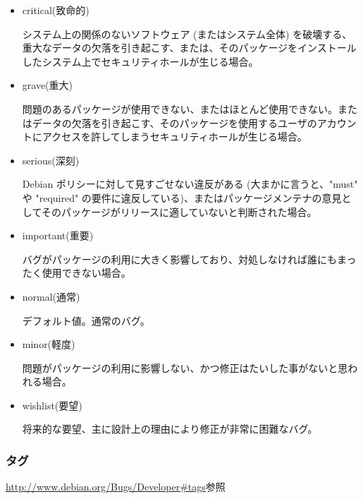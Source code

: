 \documentclass[mingoth,a4paper]{jsarticle}
\begin{document}
\begin{itemize}
\item critical(致命的)

システム上の関係のないソフトウェア (またはシステム全体) を破壊する、重大なデータの欠落を引き起こす、または、そのパッケージをインストールしたシステム上でセキュリティホールが生じる場合。 

\item grave(重大)

問題のあるパッケージが使用できない、またはほとんど使用できない。またはデータの欠落を引き起こす、そのパッケージを使用するユーザのアカウントにアクセスを許してしまうセキュリティホールが生じる場合。 

\item serious(深刻)

Debian ポリシーに対して見すごせない違反がある (大まかに言うと、"must" や "required" の要件に違反している)、またはパッケージメンテナの意見としてそのパッケージがリリースに適していないと判断された場合。 

\item important(重要)

バグがパッケージの利用に大きく影響しており、対処しなければ誰にもまったく使用できない場合。 

\item normal(通常)

デフォルト値。通常のバグ。 

\item minor(軽度)

問題がパッケージの利用に影響しない、かつ修正はたいした事がないと思われる場合。 

\item wishlist(要望)

将来的な要望、主に設計上の理由により修正が非常に困難なバグ。
\end{itemize}

\subsubsection{タグ}

\url{http://www.debian.org/Bugs/Developer#tags}参照
\end{document}
